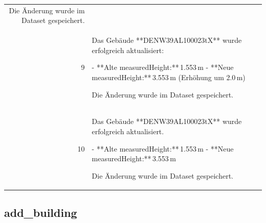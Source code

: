 \documentclass[a4paper,11pt]{article}
\begin{document}
\begin{table}[ht]
\begin{tabular}{r p{12cm}}
Die Änderung wurde im Dataset gespeichert. \\
9 & Das Gebäude **DENW39AL100023tX** wurde erfolgreich aktualisiert:

- **Alte measuredHeight:** 1.553 m  
- **Neue measuredHeight:** 3.553 m (Erhöhung um 2.0 m)  

Die Änderung wurde im Dataset gespeichert. \\
10 & Das Gebäude **DENW39AL100023tX** wurde erfolgreich aktualisiert.

- **Alte measuredHeight:** 1.553 m  
- **Neue measuredHeight:** 3.553 m  

Die Änderung wurde im Dataset gespeichert. \\
\hline
\end{tabular}
\end{table}

\clearpage
\subsection{add\_building}
\end{document}
